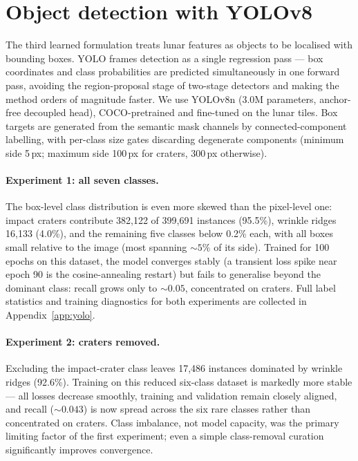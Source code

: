 \section{Object detection with YOLOv8}
\label{sec:yolo}

The third learned formulation treats lunar features as objects to be localised with bounding boxes. YOLO \citep{redmon2016yolo} frames detection as a single regression pass --- box coordinates and class probabilities are predicted simultaneously in one forward pass, avoiding the region-proposal stage of two-stage detectors and making the method orders of magnitude faster. We use YOLOv8n \citep{jocher2023yolov8} (3.0M parameters, anchor-free decoupled head), COCO-pretrained and fine-tuned on the lunar tiles. Box targets are generated from the semantic mask channels by connected-component labelling, with per-class size gates discarding degenerate components (minimum side 5\,px; maximum side 100\,px for craters, 300\,px otherwise).

\paragraph{Experiment 1: all seven classes.}
The box-level class distribution is even more skewed than the pixel-level one: impact craters contribute 382{,}122 of 399{,}691 instances (95.5\%), wrinkle ridges 16{,}133 (4.0\%), and the remaining five classes below 0.2\% each, with all boxes small relative to the image (most spanning ${\sim}5\%$ of its side). Trained for 100 epochs on this dataset, the model converges stably (a transient loss spike near epoch 90 is the cosine-annealing restart) but fails to generalise beyond the dominant class: recall grows only to ${\sim}0.05$, concentrated on craters. Full label statistics and training diagnostics for both experiments are collected in Appendix~\ref{app:yolo}.

\paragraph{Experiment 2: craters removed.}
Excluding the impact-crater class leaves 17{,}486 instances dominated by wrinkle ridges (92.6\%). Training on this reduced six-class dataset is markedly more stable --- all losses decrease smoothly, training and validation remain closely aligned, and recall (${\sim}0.043$) is now spread across the six rare classes rather than concentrated on craters. Class imbalance, not model capacity, was the primary limiting factor of the first experiment; even a simple class-removal curation significantly improves convergence.

